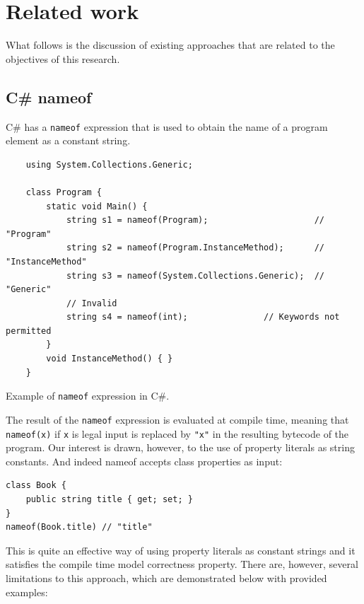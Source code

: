 \chapter{Related work}
What follows is the discussion of existing approaches that are related to the objectives of this research.

\section{C\# nameof}
C\# has a \texttt{nameof} expression \cite{cSharp-nameof} that is used to obtain the name of a program element as a constant string.

\begin{listing}[H]
    \begin{verbatim}
    using System.Collections.Generic;

    class Program {
        static void Main() {
            string s1 = nameof(Program);                     // "Program"
            string s2 = nameof(Program.InstanceMethod);      // "InstanceMethod"
            string s3 = nameof(System.Collections.Generic);  // "Generic"
            // Invalid
            string s4 = nameof(int);               // Keywords not permitted
        }
        void InstanceMethod() { }
    }
    \end{verbatim}
    \caption{Example of \texttt{nameof} expression in C\#.}
    \label{lst:csharp-nameof}
\end{listing}

The result of the \texttt{nameof} expression is evaluated at compile time, meaning that \texttt{nameof(x)} if \texttt{x} is legal input is replaced by \texttt{"x"} in the resulting bytecode of the program. Our interest is drawn, however, to the use of property literals as string constants. And indeed nameof accepts class properties as input:

\begin{verbatim}
class Book {
    public string title { get; set; }
}
nameof(Book.title) // "title"
\end{verbatim}

This is quite an effective way of using property literals as constant strings and it satisfies the compile time model correctness property. There are, however, several limitations to this approach, which are demonstrated below with provided examples:

